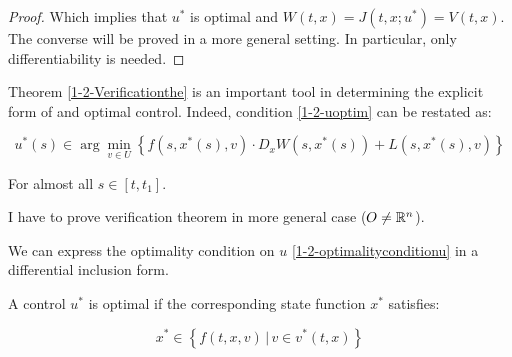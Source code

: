 \begin{theorem}
\begin{proof}
        Which implies that $u^{\ast}$ is optimal and $W(t,x)=J(t,x;u^{\ast})=V(t,x)$. 
        The converse will be proved in a more general setting. In particular, only differentiability is needed.

    \end{proof} 
\end{theorem}


Theorem \ref*{1-2-Verificationthe} is an important tool in determining the explicit form of and optimal control. 
Indeed, condition \ref*{1-2-uoptim} can be restated as:

\begin{equation}\label{1-2-optimalityconditionu}
        u^{\ast}(s) \in \arg\min_{v\in U} \left\{ f(s,x^{\ast}(s),v) \cdot D_xW(s,x^{\ast}(s)) + L(s,x^{\ast}(s),v)\right\}
\end{equation}

For almost all $s\in[t,t_1]$.

I have to prove verification theorem in more general case ($O\neq\mathbb{R}^n$).

We can express the optimality condition on $u$ \ref*{1-2-optimalityconditionu} in a differential inclusion form. 

\begin{corollary}
    A control $u^{\ast}$ is optimal if the corresponding state function $x^{\ast}$ satisfies:

    \begin{equation}
        x^{\ast} \in \left\{f(t,x,v) \,|\, v\in v^{\ast}(t,x)\right\}
    \end{equation}
\end{corollary}
